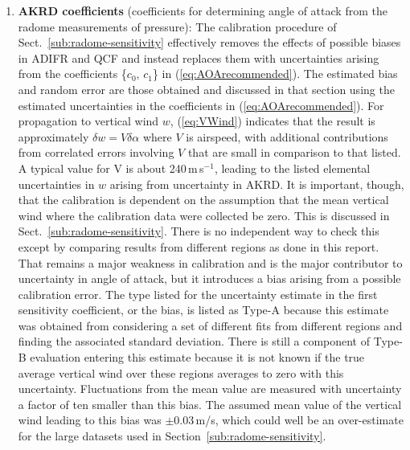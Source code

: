 \documentclass[12pt,twoside,english]{article}\usepackage[]{graphicx}\usepackage[]{color}
\let\OrgIndex\index
\renewcommand*{\index}[1]{\OrgIndex{#1}}
\begin{document}
{{\begin{enumerate}
\item \textbf{AKRD coefficients} (coefficients for determining angle of attack from the radome measurements of pressure): The calibration procedure of Sect.~\ref{sub:radome-sensitivity} effectively removes the effects of possible biases in ADIFR and QCF and instead replaces them with uncertainties arising from the coefficients \{$c_{0},\,c_{1}$\} in (\ref{eq:AOArecommended}). The estimated bias and random error are those obtained and discussed in that section using the estimated uncertainties in the coefficients in (\ref{eq:AOArecommended}). For propagation to vertical wind $w$, (\ref{eq:VWind}) indicates that the result is approximately $\delta w=V\delta\alpha$ where $V$ is airspeed, with additional contributions from correlated errors involving $V$ that are small in comparison to that listed. A typical value for V is about 240\,m\,s$^{-1}$, leading to the listed elemental uncertainties in $w$ arising from uncertainty in AKRD. It is important, though, that the calibration is dependent on the assumption that the mean vertical wind where the calibration data were collected be zero. This is discussed in Sect.~\ref{sub:radome-sensitivity}. There is no independent way to check this except by comparing results from different regions as done in this report. That remains a major weakness in calibration and is the major contributor to uncertainty in angle of attack, but it introduces a bias arising from a possible calibration error. The type listed for the uncertainty estimate in the first sensitivity coefficient, or the bias, is listed as Type-A because this estimate was obtained from considering a set of different fits from different regions and finding the associated standard deviation. There is still a component of Type-B evaluation entering this estimate because it is not known if the true average vertical wind over these regions averages to zero with this uncertainty. Fluctuations from the mean value are measured with uncertainty a factor of ten smaller than this bias. The assumed mean value of the vertical wind leading to this bias was $\pm$0.03\,m/s, which could well be an over-estimate for the large datasets used in Section~\ref{sub:radome-sensitivity}.  

\end{enumerate}}}
\end{document}
